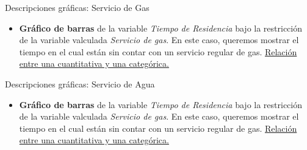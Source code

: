 \documentclass[UTF8]{beamer}
\begin{document}
\begin{frame}{Descripciones gráficas: Servicio de Gas}
\begin{itemize}

   \item \textbf{Gráfico de barras} de la variable \textit{Tiempo de Residencia} bajo la restricción de la variable valculada \textit{Servicio de gas}. En este caso, queremos mostrar el tiempo en el cual están sin contar con un servicio regular de gas.
   \underline{Relación entre una cuantitativa y una categórica.}

\end{itemize}

\end{frame}

\begin{frame}{Descripciones gráficas: Servicio de Agua}
\begin{itemize}
   \item \textbf{Gráfico de barras} de la variable \textit{Tiempo de Residencia} bajo la restricción de la variable valculada \textit{Servicio de gas}. En este caso, queremos mostrar el tiempo en el cual están sin contar con un servicio regular de gas.
   \underline{Relación entre una cuantitativa y una categórica.}

\end{itemize}

\end{frame}
\end{document}
